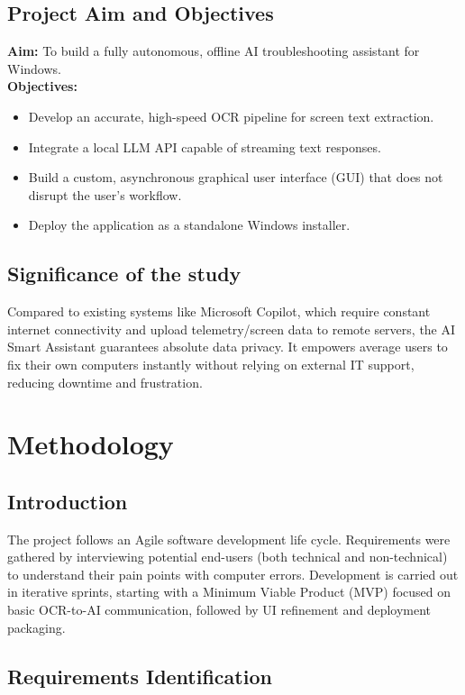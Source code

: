 \documentclass[12pt,a4paper]{report}
\begin{document}
\section{Project Aim and Objectives}
\textbf{Aim:} To build a fully autonomous, offline AI troubleshooting assistant for Windows. \\
\textbf{Objectives:}
\begin{itemize}
    \item Develop an accurate, high-speed OCR pipeline for screen text extraction.
    \item Integrate a local LLM API capable of streaming text responses.
    \item Build a custom, asynchronous graphical user interface (GUI) that does not disrupt the user's workflow.
    \item Deploy the application as a standalone Windows installer.
\end{itemize}

\section{Significance of the study}
Compared to existing systems like Microsoft Copilot, which require constant internet connectivity and upload telemetry/screen data to remote servers, the AI Smart Assistant guarantees absolute data privacy. It empowers average users to fix their own computers instantly without relying on external IT support, reducing downtime and frustration.

\chapter{Methodology}

\section{Introduction}
The project follows an Agile software development life cycle. Requirements were gathered by interviewing potential end-users (both technical and non-technical) to understand their pain points with computer errors. Development is carried out in iterative sprints, starting with a Minimum Viable Product (MVP) focused on basic OCR-to-AI communication, followed by UI refinement and deployment packaging.

\section{Requirements Identification}
\end{document}
